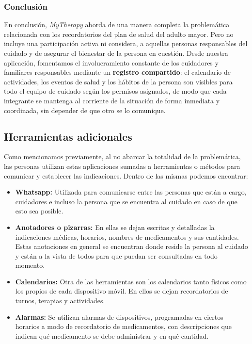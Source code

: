 \documentclass[a4paper,12pt]{article}
\begin{document}
    \subsubsection{Conclusión}
    \par En conclusión, \textit{MyTherapy} aborda de una manera completa la problemática relacionada con los recordatorios del plan de salud del adulto mayor. Pero no incluye una participación activa ni considera, a aquellas personas responsables del cuidado y de asegurar el bienestar de la persona en cuestión. Desde nuestra aplicación, fomentamos el involucramiento constante de los cuidadores y familiares responsables mediante un \textbf{registro compartido}: el calendario de actividades, los eventos de salud y los hábitos de la persona son visibles para todo el equipo de cuidado según los permisos asignados, de modo que cada integrante se mantenga al corriente de la situación de forma inmediata y coordinada, sin depender de que otro se lo comunique.
    \subsection{Herramientas adicionales}
    \par Como mencionamos previamente, al no abarcar la totalidad de la problemática, las personas utilizan estas aplicaciones sumadas a herramientas o métodos para comunicar y establecer las indicaciones. Dentro de las mismas podemos encontrar:
    \begin{itemize}
        \item \textbf{Whatsapp:} Utilizada para comunicarse entre las personas que están a cargo, cuidadores e incluso la persona que se encuentra al cuidado en caso de que esto sea posible.
        \item \textbf{Anotadores o pizarras:} En ellas se dejan escritas y detalladas la indicaciones médicas, horarios, nombres de medicamentos y sus cantidades. Estas anotaciones en general se encuentran donde reside la persona al cuidado y están a la vista de todos para que puedan ser consultadas en todo momento.
        \item \textbf{Calendarios:} Otra de las herramientas son los calendarios tanto físicos como los propios de cada dispositivo móvil. En ellos se dejan recordatorios de turnos, terapias y actividades.
        \item \textbf{Alarmas:} Se utilizan alarmas de dispositivos, programadas en ciertos horarios a modo de recordatorio de medicamentos, con descripciones que indican qué medicamento se debe administrar y en qué cantidad.
    \end{itemize}
\end{document}
